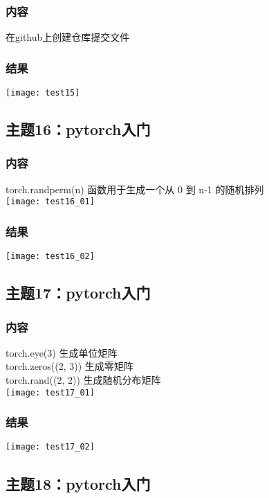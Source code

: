 \documentclass{article}
\begin{document}
\subsubsection{内容}
在github上创建仓库提交文件\\
\subsubsection{结果}  
\texttt{[image: test15]}\\ 
\vspace{1cm}
\subsection{主题16：pytorch入门}  
\subsubsection{内容}
torch.randperm(n) 函数用于生成一个从 0 到 n-1 的随机排列\\
\texttt{[image: test16\_01]}\\ 
\subsubsection{结果}  
\texttt{[image: test16\_02]}\\ 
\vspace{1cm}
\subsection{主题17：pytorch入门}  
\subsubsection{内容}
torch.eye(3)  生成单位矩阵\\
torch.zeros((2, 3))  生成零矩阵\\
torch.rand((2, 2)) 生成随机分布矩阵\\
\texttt{[image: test17\_01]}\\
\subsubsection{结果}  
\texttt{[image: test17\_02]}\\ 
\vspace{1cm}
\subsection{主题18：pytorch入门}  
\end{document}
